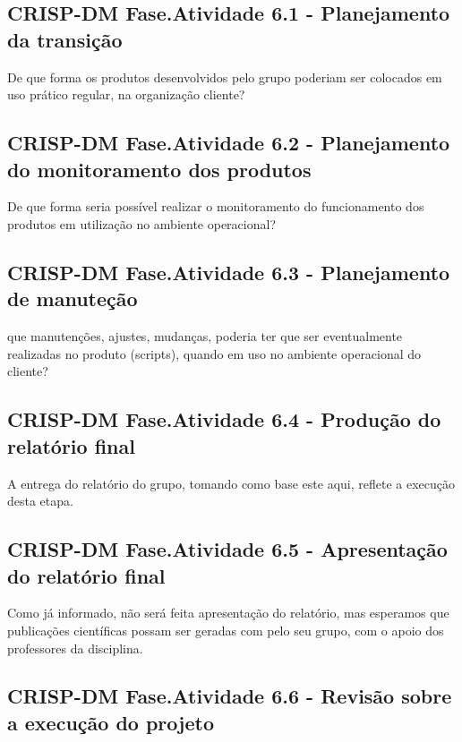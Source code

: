 \documentclass[]{article}
\begin{document}
\subsection{CRISP-DM Fase.Atividade 6.1 - Planejamento da
transição}\label{crisp-dm-fase.atividade-6.1---planejamento-da-transicao}

De que forma os produtos desenvolvidos pelo grupo poderiam ser colocados
em uso prático regular, na organização cliente?

\subsection{CRISP-DM Fase.Atividade 6.2 - Planejamento do monitoramento
dos
produtos}\label{crisp-dm-fase.atividade-6.2---planejamento-do-monitoramento-dos-produtos}

De que forma seria possível realizar o monitoramento do funcionamento
dos produtos em utilização no ambiente operacional?

\subsection{CRISP-DM Fase.Atividade 6.3 - Planejamento de
manuteção}\label{crisp-dm-fase.atividade-6.3---planejamento-de-manutecao}

que manutenções, ajustes, mudanças, poderia ter que ser eventualmente
realizadas no produto (scripts), quando em uso no ambiente operacional
do cliente?

\subsection{CRISP-DM Fase.Atividade 6.4 - Produção do relatório
final}\label{crisp-dm-fase.atividade-6.4---producao-do-relatorio-final}

A entrega do relatório do grupo, tomando como base este aqui, reflete a
execução desta etapa.

\subsection{CRISP-DM Fase.Atividade 6.5 - Apresentação do relatório
final}\label{crisp-dm-fase.atividade-6.5---apresentacao-do-relatorio-final}

Como já informado, não será feita apresentação do relatório, mas
esperamos que publicações científicas possam ser geradas com pelo seu
grupo, com o apoio dos professores da disciplina.

\subsection{CRISP-DM Fase.Atividade 6.6 - Revisão sobre a execução do
projeto}\label{crisp-dm-fase.atividade-6.6---revisao-sobre-a-execucao-do-projeto}
\end{document}
